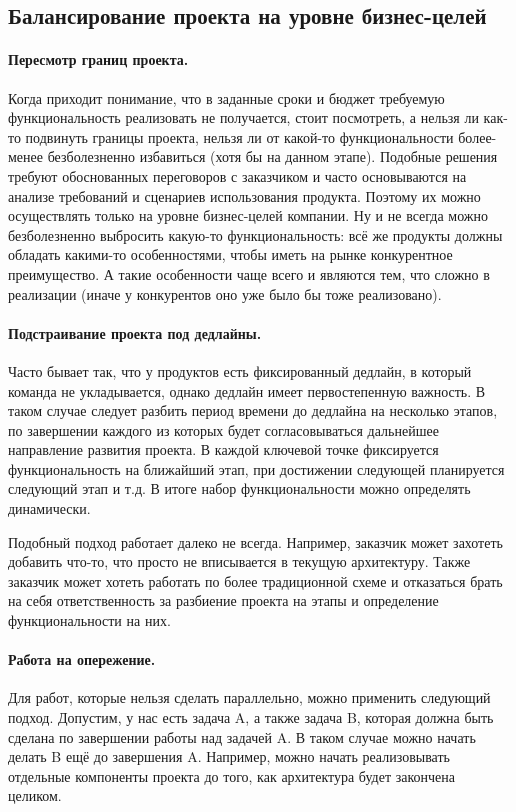 \documentclass{../../text-style}
\begin{document}
\subsection{Балансирование проекта на уровне бизнес-целей}

\paragraph{Пересмотр границ проекта.} Когда приходит понимание, что в заданные сроки и бюджет требуемую функциональность реализовать не получается, стоит посмотреть, а нельзя ли как-то подвинуть границы проекта, нельзя ли от какой-то функциональности более-менее безболезненно избавиться (хотя бы на данном этапе). Подобные решения требуют обоснованных переговоров с заказчиком и часто основываются на анализе требований и сценариев использования продукта. Поэтому их можно осуществлять только на уровне бизнес-целей компании. Ну и не всегда можно безболезненно выбросить какую-то функциональность: всё же продукты должны обладать какими-то особенностями, чтобы иметь на рынке конкурентное преимущество. А такие особенности чаще всего и являются тем, что сложно в реализации (иначе у конкурентов оно уже было бы тоже реализовано).

\paragraph{Подстраивание проекта под дедлайны.} Часто бывает так, что у продуктов есть фиксированный дедлайн, в который команда не укладывается, однако дедлайн имеет первостепенную важность. В таком случае следует разбить период времени до дедлайна на несколько этапов, по завершении каждого из которых будет согласовываться дальнейшее направление развития проекта. В каждой ключевой точке фиксируется функциональность на ближайший этап, при достижении следующей планируется следующий этап и т.д. В итоге набор функциональности можно определять динамически.

Подобный подход работает далеко не всегда. Например, заказчик может захотеть добавить что-то, что просто не вписывается в текущую архитектуру. Также заказчик может хотеть работать по более традиционной схеме и отказаться брать на себя ответственность за разбиение проекта на этапы и определение функциональности на них.

\paragraph{Работа на опережение.} Для работ, которые нельзя сделать параллельно, можно применить следующий подход. Допустим, у нас есть задача A, а также задача B, которая должна быть сделана по завершении работы над задачей A. В таком случае можно начать делать B ещё до завершения A. Например, можно начать реализовывать отдельные компоненты проекта до того, как архитектура будет закончена целиком.
\end{document}

